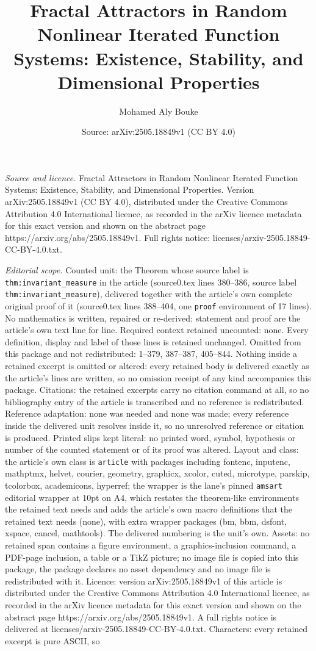 \documentclass[10pt,a4paper]{amsart}
\title[Fractal Attractors in Random Nonlinear Iterated Function Sys]{Fractal Attractors in Random Nonlinear Iterated Function Systems: Existence, Stability, and Dimensional Properties}
\author{Mohamed Aly Bouke}
\date{Source: arXiv:2505.18849v1 (CC BY 4.0)}
\begin{document}
\maketitle

\noindent\emph{Source and licence.} Fractal Attractors in Random Nonlinear Iterated Function Systems: Existence, Stability, and Dimensional Properties. Version arXiv:2505.18849v1 (CC BY 4.0), distributed under the Creative Commons Attribution 4.0 International licence, as recorded in the arXiv licence metadata for this exact version and shown on the abstract page https://arxiv.org/abs/2505.18849v1. Full rights notice: licenses/arxiv-2505.18849-CC-BY-4.0.txt.\par\smallskip

\noindent\textit{Editorial scope.} Counted unit: the Theorem whose source label is \texttt{thm:invariant\_measure} in the article (source0.tex lines 380--386, source label \texttt{thm:invariant\_measure}), delivered together with the article's own complete original proof of it (source0.tex lines 388--404, one \texttt{proof} environment of 17 lines). No mathematics is written, repaired or re-derived: statement and proof are the article's own text line for line. Required context retained uncounted: none. Every definition, display and label of those lines is retained unchanged. Omitted from this package and not redistributed: 1--379, 387--387, 405--844. Nothing inside a retained excerpt is omitted or altered: every retained body is delivered exactly as the article's lines are written, so no omission receipt of any kind accompanies this package. Citations: the retained excerpts carry no citation command at all, so no bibliography entry of the article is transcribed and no reference is redistributed. Reference adaptation: none was needed and none was made; every reference inside the delivered unit resolves inside it, so no unresolved reference or citation is produced. Printed slips kept literal: no printed word, symbol, hypothesis or number of the counted statement or of its proof was altered. Layout and class: the article's own class is \texttt{article} with packages including fontenc, inputenc, mathptmx, helvet, courier, geometry, graphicx, xcolor, cuted, microtype, parskip, tcolorbox, academicons, hyperref; the wrapper is the lane's pinned \texttt{amsart} editorial wrapper at 10pt on A4, which restates the theorem-like environments the retained text needs and adds the article's own macro definitions that the retained text needs (none), with extra wrapper packages (bm, bbm, dsfont, xspace, cancel, mathtools). The delivered numbering is the unit's own. Assets: no retained span contains a figure environment, a graphics-inclusion command, a PDF-page inclusion, a table or a TikZ picture; no image file is copied into this package, the package declares no asset dependency and no image file is redistributed with it. Licence: version arXiv:2505.18849v1 of this article is distributed under the Creative Commons Attribution 4.0 International licence, as recorded in the arXiv licence metadata for this exact version and shown on the abstract page https://arxiv.org/abs/2505.18849v1. A full rights notice is delivered at licenses/arxiv-2505.18849-CC-BY-4.0.txt. Characters: every retained excerpt is pure ASCII, so 
\end{document}
